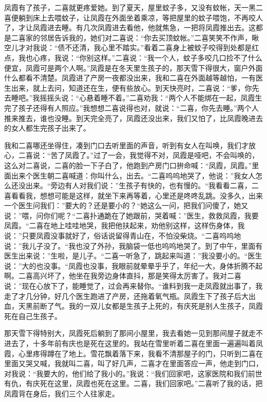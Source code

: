 \documentclass[12pt,UTF8]{ctexbook}
\begin{document}
凤霞有了孩子，二喜就更疼爱她。到了夏天，屋里蚊子多，又没有蚊帐，天一黑二喜便躺到床上去喂蚊子，让凤霞在外面坐着乘凉，等把屋里的蚊子喂饱，不再咬人了，才让凤霞进去睡。有几次凤霞进去看他，他就焦急，一把将凤霞推出去。这都是二喜家的邻居告诉我的，她们对二喜说：“你去买顶蚊帐。”二喜笑笑不作声，瞅空儿才对我说：“债不还清，我心里不踏实。”看着二喜身上被蚊子咬得到处都是红点，我也心疼，我说：“你别这样。”二喜说：“我一个人，蚊子多咬几口捡不了什么便宜，凤霞可是两个人啊。”凤霞是在冬天里生孩子的，那天雪下得很大，窗户外面什么都看不清楚。凤霞进了产房一夜都没出来，我和二喜在外面越等越怕，一有医生出来，就上去问，知道还在生，便有些放心。到天快亮时，二喜说：“爹，你先去睡吧。”我摇摇头说：“心悬着睡不着。”二喜劝我：“两个人不能绑在一起，凤霞生完了孩子还得有人照应。”我想想二喜说得也对，就说：“二喜，你先去睡。”两个人推来推去，谁也没睡。到天完全亮了，凤霞还没出来，我们又怕了，比凤霞晚进去的女人都生完孩子出来了。

我和二喜哪还坐得住，凑到门口去听里面的声音，听到有女人在叫唤，我们才放心，二喜说：“苦了凤霞了。”过了一会，我觉得不对，凤霞是哑吧，不会叫唤的，这么对二喜说，二喜的脸一下子白了，他跑到产房门口拚命喊：“凤霞，凤霞。”里面出来个医生朝二喜喊道：你叫什么，出去。“二喜呜呜地哭了，他说：”我女人怎么还没出来。“旁边有人对我们说：”生孩子有快的，也有慢的。“我看看二喜，二喜看看我，想想可能是这样，就坐下来再等着，心里还是咚咚乱跳。没多久，出来一个医生问我们：”要大的？还是要小的？“她这么一问，把我们问傻了，她又说：”喂，问你们呢？“二喜扑通跪在了她跟前，哭着喊：”医生，救救凤霞，我要凤霞。“二喜在地上哇哇地哭，我把他扶起来，劝他别这样，这样伤身体，我说：”只要凤霞没事就好了，俗话说留得青山在，不怕没柴烧。“二喜呜呜地说：”我儿子没了。“我也没了外孙，我脑袋一低也呜呜地哭了。到了中午，里面有医生出来说：”生啦，是儿子。“二喜一听急了，跳起来叫道：”我没要小的。“医生说：”大的也没事。“凤霞也没事，我眼前就晕晕乎乎了，年纪一大，身体折腾不起啊。二喜高兴坏了，他坐在我旁边身体直抖，那是笑得太厉害了。我对二喜说：”现在心放下了，能睡觉了，过会再来替你。“谁料到我一走凤霞就出事了，我走了才几分钟，好几个医生跑进了产房，还拖着氧气瓶。凤霞生下了孩子后大出血，天黑前断了气。我的一双儿女都是生孩子上死的，有庆死是别人生孩子，凤霞死在自己生孩子。

那天雪下得特别大，凤霞死后躺到了那间小屋里，我去看她一见到那间屋子就走不进去了，十多年前有庆也是死在这里的。我站在雪里听着二喜在里面一遍遍叫着凤霞，心里疼得蹲在了地上。雪花飘着落下来，我看不清那屋子的门，只听到二喜在里面又哭又喊，我就叫二喜，叫了好几声，二喜才在里面答应一声，他走到门口，对我说：“我要大的，他们给了我小的。”我说：“我们回家吧，这家医院和我们前世有仇，有庆死在这里，凤霞也死在这里。二喜，我们回家吧。”二喜听了我的话，把凤霞背在身后，我们三个人往家走。
\end{document}
